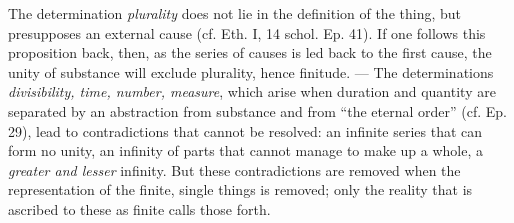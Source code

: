 \documentclass[12pt,a4paper,openany]{book}
\begin{document}
The determination \emph{plurality} does not lie in the definition of the thing, but
presupposes an external cause (cf. Eth. I, 14 schol. Ep. 41). If one follows
this proposition back, then, as the series of causes is led
back to the first cause, the unity of substance will exclude plurality,
hence finitude. --- The determinations \emph{divisibility, time, number, measure}, which
arise when duration and quantity are separated by an abstraction from
substance and from ``the eternal order'' (cf. Ep. 29), lead to
contradictions that cannot be resolved: an infinite series that can form no unity,
an infinity of parts that cannot manage to make up
a whole, a \emph{greater and lesser} infinity. But these
contradictions are removed when the representation of the finite, single things
is removed; only the reality that is ascribed to these as finite calls
those forth.
\end{document}
